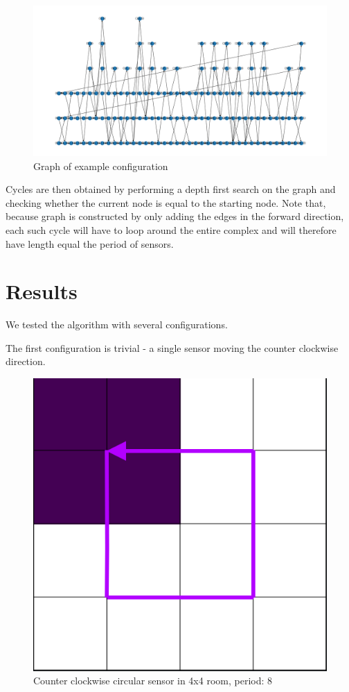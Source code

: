 \documentclass{article}
\begin{document}
\begin{figure}[H]
  \centering
  \includegraphics[width=\linewidth]{example_graph.png}
  \caption{Graph of example configuration}
  \label{fig:example_graph}
\end{figure}


Cycles are then obtained by performing a depth first search on the graph and checking whether the current node is equal to the starting node.
Note that, because graph is constructed by only adding the edges in the forward direction, each such cycle will have to loop around the entire complex and will therefore have length equal the period of sensors.


\section{Results}

We tested the algorithm with several configurations.

The first configuration is trivial - a single sensor moving the counter clockwise direction.
\begin{figure}[H]
  \centering
  \includegraphics[width=0.7\linewidth]{ccw.png}
  \caption{Counter clockwise circular sensor in 4x4 room, period: 8}
  \label{fig:ccw}
\end{figure}
\end{document}
